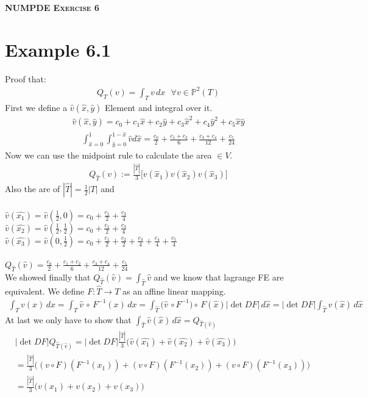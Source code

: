 \documentclass[11pt,a4paper]{article}
\begin{document}
\begin{center}
    \fontsize{24pt}{10pt}\selectfont
    \textsc{\textbf{NUMPDE Exercise 6}}
\end{center}
\section{Example 6.1}
Proof that:
\begin{align*}
Q_T(v) = \int_T v\,dx\,\,\,\, \forall v \in \mathbb{P}^2(T)
\end{align*}
First we define a $\hat{v}(\hat{x},\hat{y})$ Element and integral over it. 
\begin{align*}
\hat{v}(\hat{x},\hat{y}) = c_0+c_1\hat{x}+c_2\hat{y}+c_3\hat{x}^2+c_4\hat{y}^2+c_5\hat{x}\hat{y}
\end{align*}
\begin{align*}
\int_{\hat{x}=0}^1\int_{\hat{y}=0}^{1-\hat{x}}\hat{v}d\hat{x} = \frac{c_0}{2}+\frac{c_1+c_2}{6}+\frac{c_3+c_4}{12}+\frac{c_5}{24}
\end{align*}
Now we can use the midpoint rule to calculate the area $\in V$.
\begin{align*}
Q_{\hat{T}}(v) := \frac{|\hat{T}|}{3}\big[v(\hat{x}_1)v(\hat{x}_2)v(\hat{x}_3)\big]
\end{align*}
Also the are of $|\hat{T}| = \frac{1}{2}|T|$ and  \\\\
$\hat{v}(\hat{x_1}) = \hat{v}(\frac{1}{2},0) = c_0 + \frac{c_1}{2} + \frac{c_3}{4}$\\
$\hat{v}(\hat{x_2}) = \hat{v}(\frac{1}{2},\frac{1}{2}) = c_0+\frac{c_1}{2}+\frac{c_3}{4}$\\
$\hat{v}(\hat{x_3}) = \hat{v}(0,\frac{1}{2}) = c_0+\frac{c_1}{2} + \frac{c_2}{2}+\frac{c_3}{4}+\frac{c_4}{4}+\frac{c_5}{4}$\\\\
$Q_{\hat{T}}(\hat{v}) = \frac{c_0}{2}+\frac{c_1+c_2}{6}+\frac{c_3+c_4}{12}+\frac{c_5}{24}$\\
We showed finally that $Q_{\hat{T}}(\hat{v}) = \int_{\hat{T}}\hat{v}$ and we know that lagrange FE are equivalent. We define $F: \hat{T} \to T$ as an affine linear mapping.
\begin{align*}
\int_{T}v(x)\, dx  = \int_T\hat{v}\, \circ\, F^{-1}(x)\,dx = \int_{\hat{T}}\Big(\hat{v}\,\circ F^{-1}\Big)\circ\,F(\hat{x})|\det DF|\,d\hat{x}=|\det DF|\int_{\hat{T}}\hat{v}(\hat{x})\,d\hat{x}
\end{align*}
At last we only have to show that $\int_{\hat{T}}\hat{v}(\hat{x})\,d\hat{x} = Q_{\hat{T}(\hat{v})}$
\begin{align*}
& |\det DF|Q_{\hat{T}(\hat{v})} = |\det DF|\frac{|\hat{T}|}{3}\Big(\hat{v}(\hat{x_1})+\hat{v}(\hat{x_2})+\hat{v}(\hat{x_3})\Big)\\ & =
\frac{|\hat{T}|}{3} \Bigg((v\circ F)(F^{-1}(x_1))+(v\circ F)(F^{-1}(x_2))+(v\circ F)(F^{-1}(x_3))\Bigg) \\ & = \frac{|\hat{T}|}{3}\Big(v(x_1)+v(x_2)+v(x_3)\Big)
\end{align*}
\newpage
\end{document}

